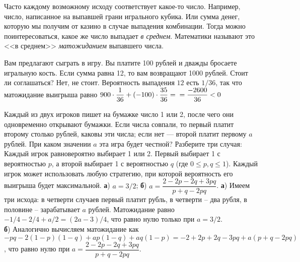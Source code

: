 \documentclass[a4paper,11pt]{article}
\begin{document}


Часто каждому возможному исходу соответствует какое-то число.
Например, число, написанное на выпавшей грани игрального кубика.
Или сумма денег, которую мы получим от казино в случае выпадения комбинации.
Тогда можно поинтересоваться, какое же число выпадает \textit{в среднем}.
Математики называют это <<в среднем>> {\it матожиданием} выпавшего числа.



Вам предлагают сыграть в игру.
Вы платите 100 рублей и дважды бросаете игральную кость.
Если сумма равна 12, то вам возвращают 1000 рублей.
Стоит ли соглашаться?
Нет, не стоит.
Вероятность выпадения $12$ есть $1/36$, так что матожидание выигрыша равно $900 \cdot \dfrac{1}{36} + (-100) \cdot \dfrac{35}{36} = \\ = \dfrac{-2600}{36} < 0$


























Каждый из двух игроков пишет на бумажке число 1 или 2, после чего
они одновременно открывают бумажки.
Если числа совпали, то первый платит второму столько рублей, каковы
эти числа; если нет --- второй платит первому $a$ рублей.
При каком значении $a$ эта игра будет честной?
Разберите три случая:
Каждый игрок равновероятно выбирает 1 или 2.
Первый выбирает 1 с вероятностью $p$, а второй выбирает 1 с вероятностью $q$ (где $0\leq p,q\leq1$).
Каждый игрок может использовать любую стратегию, при которой вероятность его выигрыша будет максимальной.
\textbf{а}) $a=3/2$; \textbf{б}) $a=\dfrac{2-2p-2q+3pq}{p+q-2pq}$.
\textbf{а}) Имеем три исхода: в четверти случаев первый платит рубль, в четверти -- два рубля, в половине -- зарабатывает $a$ рублей. Матожидание равно $-1/4-2/4+a/2=(2a-3)/4$, что равно нулю только при $a=3/2$.
\\\textbf{б}) Аналогично вычисляем матожидание как $-pq-2(1-p)(1-q)+ap(1-q)+aq(1-p) = -2+2p+2q-3pq+a(p+q-2pq)$, что равно нулю при $a=\dfrac{2-2p-2q+3pq}{p+q-2pq}$.
\end{document}
